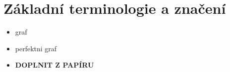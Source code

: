 \chapter*{Základní terminologie a značení}

\begin{itemize}
    \item graf
    \item perfektni graf
    \item \textbf{DOPLNIT Z PAPÍRU}
\end{itemize}